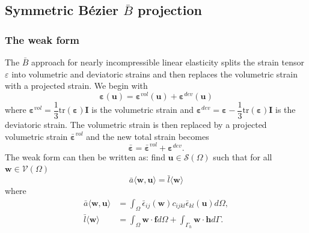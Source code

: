 \documentclass{article}
\newcommand\mi{\mathbf{I}}
\newcommand{\Bezier}{{B\'{e}zier} }
\begin{document}
\subsection{Symmetric \Bezier $\bar{B}$ projection}
\subsubsection{The weak form}
The $\bar{B}$ approach for nearly incompressible linear elasticity splits the strain tensor $\varepsilon$ into volumetric and deviatoric strains and then replaces the volumetric strain with a projected strain. We begin with
\begin{equation}
\boldsymbol{\varepsilon}(\mathbf{u})=\boldsymbol{\varepsilon}^{vol}(\mathbf{u})+\boldsymbol{\varepsilon}^{dev}(\mathbf{u})
\end{equation}
where $\boldsymbol{\varepsilon}^{vol}=\dfrac{1}{3}\mathrm{tr}(\boldsymbol{\varepsilon})\mi$ is the volumetric strain and $\boldsymbol{\varepsilon}^{dev}=\boldsymbol{\varepsilon}-\dfrac{1}{3}\mathrm{tr}(\boldsymbol{\varepsilon})\mi$ is the deviatoric strain. The volumetric strain is then replaced by a projected volumetric strain $\bar{\boldsymbol{\varepsilon}}^{vol}$ and the new total strain becomes
\begin{equation}
\bar{\boldsymbol{\varepsilon}}=\bar{\boldsymbol{\varepsilon}}^{vol}+\boldsymbol{\varepsilon}^{dev}.
\end{equation}
The weak form can then be written as: find $\mathbf{u}\in{\mathcal{S}(\Omega)}$ such that for all $\mathbf{w}\in{\mathcal{V}(\Omega)}$
\begin{equation}
    \bar{a}\langle{\mathbf{w},\mathbf{u}}\rangle=\bar{l}\langle{\mathbf{w}}\rangle
\end{equation}
where
\begin{align}
    \bar{a}\langle{\mathbf{w},\mathbf{u}}\rangle&=\int_{\Omega}\bar{\epsilon}_{ij}(\mathbf{w})c_{ijkl}\bar{\epsilon}_{kl}(\mathbf{u})d\Omega, \\
    \bar{l}\langle{\mathbf{w}}\rangle&=\int_{\Omega}\mathbf{w}\cdot\mathbf{f}d\Omega+\int_{\Gamma_{h}}\mathbf{w}\cdot\mathbf{h}d\Gamma.
\end{align}
\end{document}
